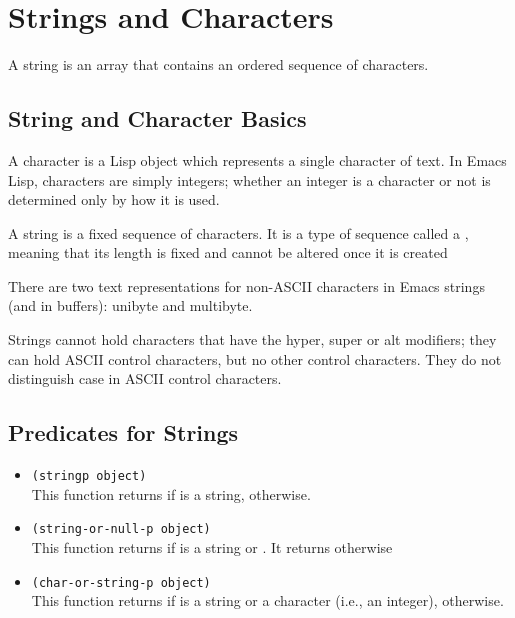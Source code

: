 
\chapter{Strings and Characters}
\label{cha:strings-characters}

A string is an array that contains an ordered sequence of characters.


\section{String and Character Basics}
\label{sec:string-char-basic}

A character is a Lisp object which represents a single character of text.
In Emacs Lisp, characters are simply integers; whether an integer is a character or not is determined only by how it is used.

A string is a fixed sequence of characters.
It is a type of sequence called a , meaning that its length is fixed and cannot be altered once it is created 

There are two text representations for non-ASCII characters in Emacs strings (and in buffers): unibyte and multibyte. 

Strings cannot hold characters that have the hyper, super or alt modifiers; they can hold ASCII control characters, but no other control characters.
They do not distinguish case in ASCII control characters.


\section{Predicates for Strings}
\label{sec:predicates-strings}

\begin{itemize}
\item \lstinline|(stringp object)|\\
  This function returns  if  is a string,  otherwise.
\item \lstinline|(string-or-null-p object)|\\
  This function returns  if  is a string or .
  It returns  otherwise
\item \lstinline|(char-or-string-p object)|\\
  This function returns  if  is a string or a character (i.e., an integer),  otherwise.
\end{itemize}



